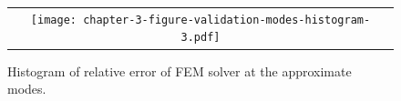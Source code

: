 \documentclass[10pt]{article}
\begin{document}
\begin{figure}
  \begin{tabular}{c}
    \begin{minipage}{0.90\textwidth}
      \centering
      \texttt{[image: chapter-3-figure-validation-modes-histogram-3.pdf]}
      \caption{Histogram of relative error of FEM solver at the
        approximate modes.}
      \label{fig:modes-histogram-3}
    \end{minipage}
  \end{tabular}
\end{figure}

 
\end{document}
